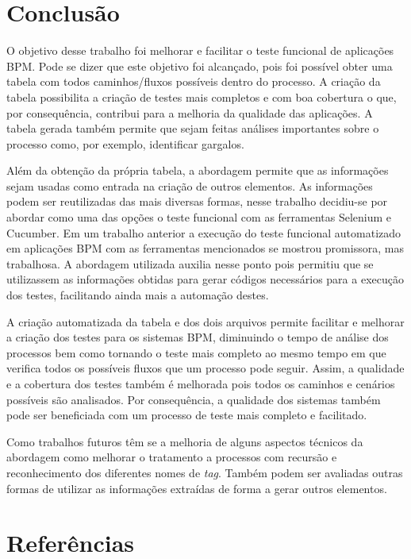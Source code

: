 \documentclass[12pt]{article}
\begin{document}
\section{Conclusão}

O objetivo desse trabalho foi melhorar e facilitar o teste funcional de aplicações BPM. Pode se dizer que este objetivo foi alcançado, pois foi possível obter uma tabela com todos caminhos/fluxos possíveis dentro do processo. A criação da tabela possibilita a criação de testes mais completos e com boa cobertura o que, por consequência, contribui para a melhoria da qualidade das aplicações. A tabela gerada também permite que sejam feitas análises importantes sobre o processo como, por exemplo, identificar gargalos.

Além da obtenção da própria tabela, a abordagem permite que as informações sejam usadas como entrada na criação de outros elementos. As informações podem ser reutilizadas das mais diversas formas, nesse trabalho decidiu-se por abordar como uma das opções o teste funcional com as ferramentas Selenium e Cucumber. Em um trabalho anterior a execução do teste funcional automatizado em aplicações BPM com as ferramentas mencionados se mostrou promissora, mas trabalhosa. A abordagem utilizada auxilia nesse ponto pois permitiu que se utilizassem as informações obtidas para gerar códigos necessários para a execução dos testes, facilitando ainda mais a automação destes.

A criação automatizada da tabela e dos dois arquivos permite facilitar e melhorar a criação dos testes para os sistemas BPM, diminuindo o tempo de análise dos processos bem como tornando o teste mais completo ao mesmo tempo em que verifica todos os possíveis fluxos que um processo pode seguir. Assim, a qualidade e a cobertura dos testes também é melhorada pois todos os caminhos e cenários possíveis são analisados. Por consequência, a qualidade dos sistemas também pode ser beneficiada com um processo de teste mais completo e facilitado.

Como trabalhos futuros têm se a melhoria de alguns aspectos técnicos da abordagem como melhorar o tratamento a processos com recursão e reconhecimento dos diferentes nomes de \emph{tag}. Também podem ser avaliadas outras formas de utilizar as informações extraídas de forma a gerar outros elementos.
 

\section{Referências}



\end{document}
